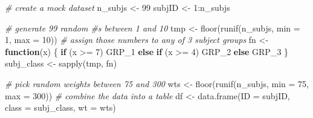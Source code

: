 \documentclass[smallextended]{svjour3}       %
\newenvironment{Shaded}{\begin{snugshade}}{\end{snugshade}}
\newcommand{\AttributeTok}[1]{\textcolor[rgb]{0.77,0.63,0.00}{#1}}
\newcommand{\CommentTok}[1]{\textcolor[rgb]{0.56,0.35,0.01}{\textit{#1}}}
\newcommand{\ControlFlowTok}[1]{\textcolor[rgb]{0.13,0.29,0.53}{\textbf{#1}}}
\newcommand{\DecValTok}[1]{\textcolor[rgb]{0.00,0.00,0.81}{#1}}
\newcommand{\FunctionTok}[1]{\textcolor[rgb]{0.00,0.00,0.00}{#1}}
\newcommand{\NormalTok}[1]{#1}
\newcommand{\OtherTok}[1]{\textcolor[rgb]{0.56,0.35,0.01}{#1}}
\newcommand{\SpecialCharTok}[1]{\textcolor[rgb]{0.00,0.00,0.00}{#1}}
\newcommand{\StringTok}[1]{\textcolor[rgb]{0.31,0.60,0.02}{#1}}
\begin{document}
\begin{Shaded}
\begin{Highlighting}[]
\CommentTok{\# create a mock dataset}
\NormalTok{n\_subjs }\OtherTok{\textless{}{-}} \DecValTok{99}
\NormalTok{subjID }\OtherTok{\textless{}{-}} \DecValTok{1}\SpecialCharTok{:}\NormalTok{n\_subjs}

\CommentTok{\# generate 99 random \#s between 1 and 10}
\NormalTok{tmp }\OtherTok{\textless{}{-}} \FunctionTok{floor}\NormalTok{(}\FunctionTok{runif}\NormalTok{(n\_subjs, }\AttributeTok{min =} \DecValTok{1}\NormalTok{, }\AttributeTok{max =} \DecValTok{10}\NormalTok{))}
\CommentTok{\# assign those numbers to any of 3 subject groups}
\NormalTok{fn }\OtherTok{\textless{}{-}} \ControlFlowTok{function}\NormalTok{(x) \{ }
  \ControlFlowTok{if}\NormalTok{ (x }\SpecialCharTok{\textgreater{}=} \DecValTok{7}\NormalTok{) }\StringTok{\textquotesingle{}GRP\_1\textquotesingle{}} 
  \ControlFlowTok{else} \ControlFlowTok{if}\NormalTok{ (x }\SpecialCharTok{\textgreater{}=} \DecValTok{4}\NormalTok{) }\StringTok{\textquotesingle{}GRP\_2\textquotesingle{}} 
  \ControlFlowTok{else} \StringTok{\textquotesingle{}GRP\_3\textquotesingle{}} 
\NormalTok{\}}
\NormalTok{subj\_class }\OtherTok{\textless{}{-}} \FunctionTok{sapply}\NormalTok{(tmp, fn)}

\CommentTok{\# pick random weights between 75 and 300}
\NormalTok{wts }\OtherTok{\textless{}{-}} \FunctionTok{floor}\NormalTok{(}\FunctionTok{runif}\NormalTok{(n\_subjs, }\AttributeTok{min =} \DecValTok{75}\NormalTok{, }\AttributeTok{max =} \DecValTok{300}\NormalTok{))}
\CommentTok{\# combine the data into a table}
\NormalTok{df }\OtherTok{\textless{}{-}} \FunctionTok{data.frame}\NormalTok{(}\AttributeTok{ID =}\NormalTok{ subjID, }\AttributeTok{class =}\NormalTok{ subj\_class, }\AttributeTok{wt =}\NormalTok{ wts)}


\end{Highlighting}
\end{Shaded}
\end{document}
